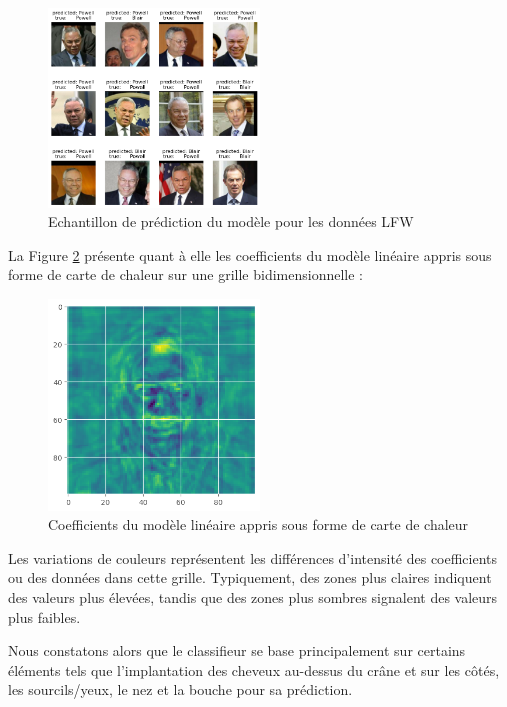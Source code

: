 \documentclass{scrartcl}
\begin{document}
\begin{figure}[H]
    \centering
    \includegraphics[width=0.5\textwidth]{../images/TB-CPpred.png}
    \caption{\centering Echantillon de prédiction du modèle pour les données LFW} 
    \label{fig:prediction}
\end{figure}

La Figure \ref{fig:cc} présente quant à elle les coefficients du modèle linéaire appris sous forme de carte de chaleur sur une grille bidimensionnelle :

\begin{figure}[H]
    \centering
    \includegraphics[width=0.5\textwidth]{../images/cc.png}
    \caption{\centering Coefficients du modèle linéaire appris sous forme de carte de chaleur} 
    \label{fig:cc}
\end{figure}

Les variations de couleurs représentent les différences d'intensité des coefficients ou des données dans cette grille. Typiquement, des zones plus claires indiquent des valeurs plus élevées, tandis que des zones plus sombres signalent des valeurs plus faibles.\newline

Nous constatons alors que le classifieur se base principalement sur certains éléments tels que l'implantation des cheveux au-dessus du crâne et sur les côtés, les sourcils/yeux, le nez et la bouche pour sa prédiction.
\end{document}
